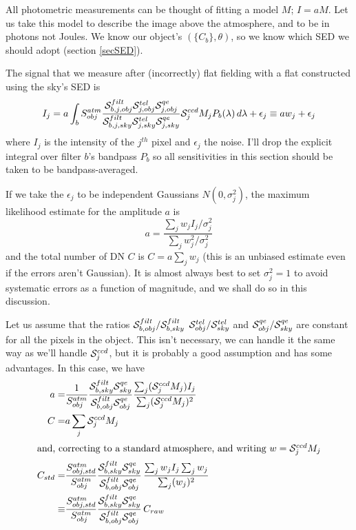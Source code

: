 \documentclass[12pt]{article}
\newcommand{\qe}{{\cal S}}
\begin{document}
All photometric measurements can be thought of fitting a model $M$; $I = a M$.  Let us take this
model to describe the image above the atmosphere, and to be in photons not Joules.
We know our object's $(\{C_b\}, \theta)$, so we know which SED we should adopt (section \ref{secSED}).

The signal that we measure after (incorrectly) flat fielding with a flat constructed using the sky's SED is
$$
I_j = a \int_{b} S_{obj}^{atm} \frac{\qe_{b, j, obj}^{filt} \qe_{j,obj}^{tel} \qe_{j,obj}^{qe}}
                                    {\qe_{b, j, sky}^{filt} \qe_{j,sky}^{tel} \qe_{j,sky}^{qe}}
            \qe_j^{ccd} M_j P_b(\lambda)\, d\lambda + \epsilon_j
    \equiv a w_j + \epsilon_j
$$
where $I_j$ is the intensity of the $j^{th}$ pixel and $\epsilon_j$ the noise.  I'll drop the explicit
integral over filter $b$'s bandpass $P_b$ so all sensitivities in this section should be taken to be
bandpass-averaged.

If we take the $\epsilon_j$ to be independent Gaussians $N(0, \sigma_j^2)$, the maximum likelihood estimate
for the amplitude $a$ is
$$
a = \frac{\sum_j w_j I_j/\sigma_j^2}{\sum_j w_j^2/\sigma_j^2}
$$
and the total number of DN $C$ is $C = a\sum_j w_j$
(this is an unbiased estimate even if the errors aren't Gaussian).
It is almost always best
to set $\sigma^2_j = 1$ to avoid systematic errors as a function of magnitude, and we shall do so
in this discussion.

Let us assume that the ratios  $\qe_{b, obj}^{filt}/\qe_{b, sky}^{filt}$ 
$\qe_{obj}^{tel}/\qe_{sky}^{tel}$ and $\qe_{obj}^{qe}/\qe_{sky}^{qe}$ are
constant for all the pixels in the object.  This isn't necessary, we can handle it the same way as we'll
handle $\qe_j^{ccd}$, but it is probably a good assumption and has some advantages.  In this case, we have
\begin{align*}
  a =& \frac{1}{S_{obj}^{atm}} \frac{\qe_{b, sky}^{filt} \qe_{sky}^{qe}}
                                    {\qe_{b, obj}^{filt} \qe_{obj}^{qe}}
                         \frac{\sum_j (\qe_j^{ccd} M_j) I_j}{\sum_j (\qe_j^{ccd} M_j)^2}\\
C =& a \sum_j \qe_j^{ccd} M_j\\
\intertext{and, correcting to a standard atmosphere, and writing $w = \qe_j^{ccd} M_j$}
C_{std} =& \frac{S_{obj,std}^{atm}}{S_{obj}^{atm}}
                  \frac{\qe_{b, sky}^{filt} \qe_{sky}^{qe}}
                       {\qe_{b, obj}^{filt} \qe_{obj}^{qe}}
                         \, \frac{\sum_j w_j I_j  \sum_j w_j}{\sum_j (w_j)^2} \\
\equiv& \frac{S_{obj,std}^{atm}}{S_{obj}^{atm}}
                  \frac{\qe_{b, sky}^{filt} \qe_{sky}^{qe}}
                       {\qe_{b, obj}^{filt} \qe_{obj}^{qe}}
                         \, C_{raw}
\end{align*}
\end{document}
